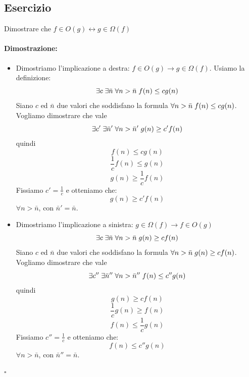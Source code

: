 \documentclass[a4paper,12pt,twoside]{report}
\begin{document}
\subsection{Esercizio}
Dimostrare che $f \in O(g) \leftrightarrow g \in \Omega(f)$
\paragraph{Dimostrazione:}
\begin{itemize}
\item Dimostriamo l'implicazione a destra: $f \in O(g) \rightarrow g \in \Omega(f)$. Usiamo la definizione: 
\[ \exists c \thickspace \exists \bar{n} \thickspace \forall n > \bar{n} \thickspace f(n) \le cg(n) \]
Siano $c$ ed $\bar{n}$ due valori che soddisfano la formula $\forall n>\bar{n} \thickspace f(n) \le cg(n)$. Vogliamo dimostrare che vale 
\[ \exists c' \thickspace \exists \bar{n}' \thickspace \forall n > \bar{n}' \thickspace g(n) \ge c' f(n) \] 
quindi \[f(n) \le cg(n)\]
\[ \frac{1}{c}f(n) \le g(n) \]
\[ g(n) \ge \frac{1}{c}f(n) \]
Fissiamo $c'=\frac{1}{c}$ e otteniamo che:
\[ g(n) \ge c'f(n) \]
$\forall n > \bar{n}$, con $\bar{n}' = \bar{n}$.
\item Dimostriamo l'implicazione a sinistra: $g \in \Omega(f) \rightarrow f \in O(g)$
\[ \exists c \thickspace \exists \bar{n} \thickspace \forall n > \bar{n} \thickspace g(n) \ge cf(n) \]
Siano $c$ ed $\bar{n}$ due valori che soddisfano la formula $\forall n > \bar{n} \thickspace g(n) \ge cf(n)$. Vogliamo dimostrare che vale
\[ \exists c'' \thickspace \exists \bar{n}'' \thickspace \forall n > \bar{n}'' \thickspace f(n) \le c''g(n) \]
quindi
\[ g(n) \ge cf(n) \]
\[ \frac{1}{c} g(n) \ge f(n) \]
\[ f(n) \le \frac{1}{c} g(n) \]
Fissiamo $c''=\frac{1}{c}$ e otteniamo che:
\[ f(n) \le c''g(n) \]
$\forall n > \bar{n}$, con $\bar{n}'' = \bar{n}$.
\end{itemize}
\begin{flushright}$\square$\end{flushright}
\end{document}
